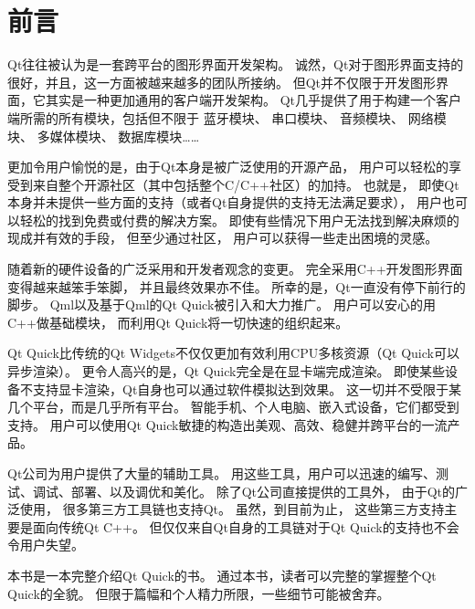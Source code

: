 ﻿%






\cleardoublepage                              %
\setcounter{secnumdepth}{-2}                  %
\chapter{
前言
}\label{c000020}
\setcounter{secnumdepth}{3}                   %


Qt往往被认为是一套跨平台的图形界面开发架构。
诚然，Qt对于图形界面支持的很好，并且，这一方面被越来越多的团队所接纳。
但Qt并不仅限于开发图形界面，它其实是一种更加通用的客户端开发架构。
Qt几乎提供了用于构建一个客户端所需的所有模块，包括但不限于
蓝牙模块、
串口模块、
音频模块、
网络模块、
多媒体模块、
数据库模块……

更加令用户愉悦的是，由于Qt本身是被广泛使用的开源产品，
用户可以轻松的享受到来自整个开源社区（其中包括整个C/C++社区）的加持。
也就是，
即使Qt本身并未提供一些方面的支持（或者Qt自身提供的支持无法满足要求），
用户也可以轻松的找到免费或付费的解决方案。
即使有些情况下用户无法找到解决麻烦的现成并有效的手段，
但至少通过社区，
用户可以获得一些走出困境的灵感。

随着新的硬件设备的广泛采用和开发者观念的变更。
完全采用C++开发图形界面变得越来越笨手笨脚，
并且最终效果亦不佳。
所幸的是，Qt一直没有停下前行的脚步。
Qml以及基于Qml的Qt Quick被引入和大力推广。
用户可以安心的用C++做基础模块，
而利用Qt Quick将一切快速的组织起来。

Qt Quick比传统的Qt Widgets不仅仅更加有效利用CPU多核资源（Qt Quick可以异步渲染）。
更令人高兴的是，Qt Quick完全是在显卡端完成渲染。
即使某些设备不支持显卡渲染，Qt自身也可以通过软件模拟达到效果。
这一切并不受限于某几个平台，而是几乎所有平台。
智能手机、个人电脑、嵌入式设备，它们都受到支持。
用户可以使用Qt Quick敏捷的构造出美观、高效、稳健并跨平台的一流产品。

Qt公司为用户提供了大量的辅助工具。
用这些工具，用户可以迅速的编写、测试、调试、部署、以及调优和美化。
除了Qt公司直接提供的工具外，
由于Qt的广泛使用，
很多第三方工具链也支持Qt。
虽然，到目前为止，
这些第三方支持主要是面向传统Qt C++。
但仅仅来自Qt自身的工具链对于Qt Quick的支持也不会令用户失望。


本书是一本完整介绍Qt Quick的书。
通过本书，读者可以完整的掌握整个Qt Quick的全貌。
但限于篇幅和个人精力所限，一些细节可能被舍弃。

